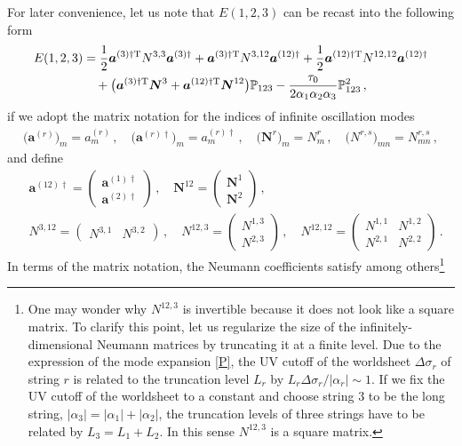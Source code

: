 \documentclass[12pt]{article}
\begin{document}
For later convenience, let us note that $E(1,2,3)$ can be recast into
the following form
\begin{align}
E(1,2,3)&=\frac{1}{2}\boldsymbol{a}^{(3)\dagger{\rm T}}N^{3,3}
\boldsymbol{a}^{(3)\dagger}
+\boldsymbol{a}^{(3)\dagger{\rm T}}
N^{3,12}\boldsymbol{a}^{(12)\dagger}
+\frac{1}{2}\boldsymbol{a}^{(12)\dagger{\rm T}}N^{12,12}
\boldsymbol{a}^{(12)\dagger}\nonumber\\
&\quad+\bigl(\boldsymbol{a}^{(3)\dagger{\rm T}}\boldsymbol{N}^{3}
+\boldsymbol{a}^{(12)\dagger{\rm T}}\boldsymbol{N}^{12}\bigr)
{\mathbb P}_{123}
-\frac{\tau_0}{2\alpha_1\alpha_2\alpha_3}{\mathbb P}^2_{123}\,,
\end{align}
if we adopt the matrix notation for the indices of infinite
oscillation modes
\begin{align}
\bigl(\boldsymbol{a}^{(r)}\bigr)_m=a^{(r)}_m\,,\quad
\bigl(\boldsymbol{a}^{(r)\dagger}\bigr)_m=a^{(r)\dagger}_m\,,\quad
\bigl(\boldsymbol{N}^{r}\bigr)_m=N^{r}_m\,,\quad
\bigl(N^{r,s}\bigr)_{mn}=N^{r,s}_{mn}\,,
\end{align}
and define
\begin{align}
&\boldsymbol{a}^{(12)\dagger}=\begin{pmatrix}
\boldsymbol{a}^{(1)\dagger}\\\boldsymbol{a}^{(2)\dagger}
\end{pmatrix}\,,\quad
\boldsymbol{N}^{12}=\begin{pmatrix}
\boldsymbol{N}^{1}\\\boldsymbol{N}^{2}\end{pmatrix}\,,\nonumber\\
&N^{3,12}=\begin{pmatrix}N^{3,1}&N^{3,2}\end{pmatrix}\,,\quad
N^{12,3}=\begin{pmatrix}N^{1,3}\\N^{2,3}\end{pmatrix}\,,\quad
N^{12,12}=\begin{pmatrix}
N^{1,1}&N^{1,2}\\N^{2,1}&N^{2,2}
\end{pmatrix}\,.
\end{align}
In terms of the matrix notation, the Neumann coefficients satisfy
among others\footnote{One may wonder why $N^{12,3}$ is invertible
because it does not look like a square matrix.
To clarify this point, let us regularize the size of the
infinitely-dimensional Neumann matrices by truncating it at a finite
level.
Due to the expression of the mode expansion \eqref{P}, the UV cutoff
of the worldsheet $\Delta\sigma_r$ of string $r$ is related to the
truncation level $L_r$ by $L_r\Delta\sigma_r/|\alpha_r|\sim 1$.
If we fix the UV cutoff of the worldsheet to a constant and choose
string 3 to be the long string, $|\alpha_3|=|\alpha_1|+|\alpha_2|$,
the truncation levels of three strings have to be related by
$L_3=L_1+L_2$.
In this sense $N^{12,3}$ is a square matrix.}
\end{document}
